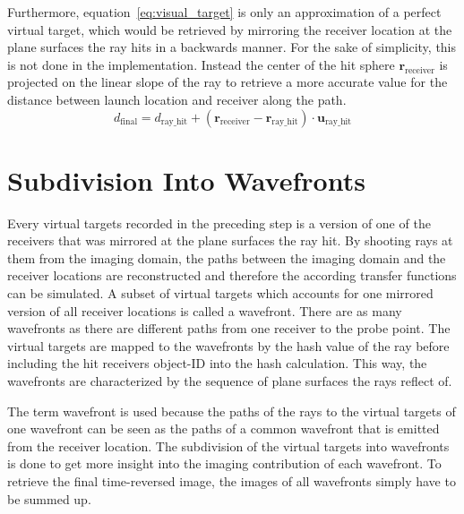 Furthermore, equation~\eqref{eq:visual_target} is only an approximation of a perfect virtual target, which would be retrieved by mirroring the receiver location at the plane surfaces the ray hits in a backwards manner.
For the sake of simplicity, this is not done in the implementation.
Instead the center of the hit sphere \(\bm{r}_{\text{receiver}}\) is projected on the linear slope of the ray to retrieve a more accurate value for the distance between launch location and receiver along the path.
\begin{equation}
    d_{\text{final}} = d_{\text{ray\_hit}} +  (\bm{r}_{\text{receiver}} - \bm{r}_{\text{ray\_hit}}) \cdot \bm{u}_{\text{ray\_hit}}
\end{equation}

\section{Subdivision Into Wavefronts}\label{section:subdivision_into_wavefronts}

Every virtual targets recorded in the preceding step is a version of one of the receivers that was mirrored at the plane surfaces the ray hit.
By shooting rays at them from the imaging domain, the paths between the imaging domain and the receiver locations are reconstructed and therefore the according transfer functions can be simulated.
A subset of virtual targets which accounts for one mirrored version of all receiver locations is called a wavefront.
There are as many wavefronts as there are different paths from one receiver to the probe point.
The virtual targets are mapped to the wavefronts by the hash value of the ray before including the hit receivers object-ID into the hash calculation.
This way, the wavefronts are characterized by the sequence of plane surfaces the rays reflect of.

The term wavefront is used because the paths of the rays to the virtual targets of one wavefront can be seen as the paths of a common wavefront that is emitted from the receiver location.
The subdivision of the virtual targets into wavefronts is done to get more insight into the imaging contribution of each wavefront.
To retrieve the final time-reversed image, the images of all wavefronts simply have to be summed up.
